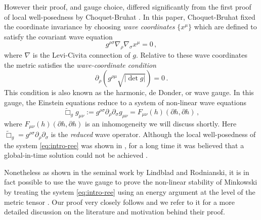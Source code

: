 \documentclass[11pt, a4paper]{amsart}
\numberwithin{equation}{section}
\numberwithin{theorem}{section}
\newcommand{\p}{\partial}
\newcommand{\mn}{{\mu \nu}}
\newcommand{\tbox}{\widetilde{\Box}}
\begin{document}
However their proof, and gauge choice, differed significantly from the first proof of local well-posedness by Choquet-Bruhat \cite{bruhat1952}. In this paper, Choquet-Bruhat fixed the coordinate invariance by choosing \textit{wave coordinates} $ \{ x^\mu \}$ which are defined to satisfy the covariant wave equation
$$ g^{\rho \sigma} \nabla_\rho \nabla_\sigma x^\mu = 0 \,,$$
where $\nabla$ is the Levi-Civita connection of $g$. Relative to these wave coordinates the metric satisfies the \textit{wave-coordinate condition}
\begin{equation}
\p_\rho \left( g^{\rho \mu} \sqrt{\vert \det g \vert} \right) = 0 \,. \label{eq:intro-wave-gauge}
\end{equation}
This condition is also known as the harmonic, de Donder, or  wave gauge. In this gauge, the Einstein equations reduce to a system of non-linear wave equations
\begin{equation}
\tbox_g g_\mn := g^{\rho \sigma} \p_\rho \p_\sigma g_\mn = F_\mn (h) (\p h, \p h) \,, \label{eq:intro-ree}
\end{equation}
where $F_\mn (h) (\p h, \p h)$ is an inhomogeneity we will discuss shortly.  Here $\tbox_g = g^{\rho \sigma} \p_\rho \p_\sigma$ is the \textit{reduced} wave operator. Although  the local well-posedness of the system \eqref{eq:intro-ree} was shown in \cite{bruhat1952}, for a long time it was believed that a global-in-time solution could not be achieved \cite{MR0315300}. 

Nonetheless as shown in the seminal work by Lindblad and Rodnianski, it is in fact possible to use the wave gauge to prove the non-linear stability of Minkowski by treating the system \eqref{eq:intro-ree} using an energy argument at the level of the metric tensor \cite{Lindblad:2003hw, LR:04}. 
Our proof very closely follows \cite{LR:04} and we refer to it for a more detailed discussion on the literature and motivation behind their proof.  \\
 
\end{document}
